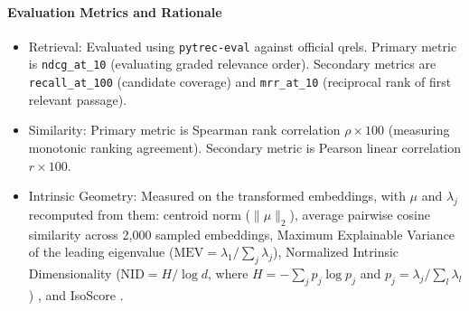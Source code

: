 \paragraph{Evaluation Metrics and Rationale}
\begin{itemize}
\item Retrieval: Evaluated using \texttt{pytrec-eval} against official qrels. Primary metric is \texttt{ndcg\_at\_10} (evaluating graded relevance order). Secondary metrics are \texttt{recall\_at\_100} (candidate coverage) and \texttt{mrr\_at\_10} (reciprocal rank of first relevant passage).
\item Similarity: Primary metric is Spearman rank correlation $\rho \times 100$ (measuring monotonic ranking agreement). Secondary metric is Pearson linear correlation $r \times 100$.
\item Intrinsic Geometry: Measured on the transformed embeddings, with $\mu$ and $\lambda_j$ recomputed from them: centroid norm ($\|\mu\|_2$), average pairwise cosine similarity across 2,000 sampled embeddings, Maximum Explainable Variance of the leading eigenvalue ($\text{MEV} = \lambda_1 / \sum_j \lambda_j$), Normalized Intrinsic Dimensionality ($\text{NID} = H / \log d$, where $H = -\sum_j p_j \log p_j$ and $p_j = \lambda_j / \sum_l \lambda_l$) \citep{yokoi2024word}, and IsoScore \citep{rudman-etal-2022-isoscore}.
\end{itemize}

